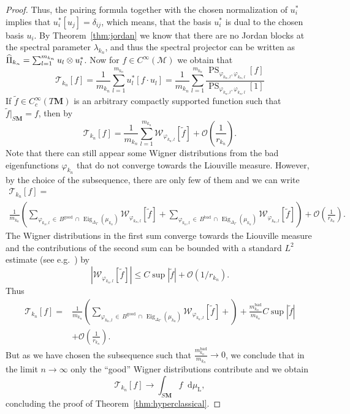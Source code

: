 \documentclass[AHL, Unicode, longabstracts, published]{cedram}
\DeclareMathOperator{\Eig}{Eig}
\DeclareMathOperator{\good}{good}
\DeclareMathOperator{\bad}{bad}
\newcommand{\rml}{\mathrm{L}}
\newcommand{\bfm}{\mathbf{M}}
\newcommand{\la}{\lambda}
\newcommand{\til}{\widetilde}
\newcommand{\intd}{\mathop{}\!\mathrm{d}}
\renewcommand*{\hat}[1]{\mathchoice{\widehat{#1}}{\widehat{#1}}{\oldhat{#1}}{\oldhat{#1}}}\let\oldexists\exists
\renewcommand*{\exists}{\mathrel{\oldexists}}
\begin{document}
\begin{proof}
Thus, the pairing formula together with the chosen normalization of $u_i^*$ implies that $u_i^*[u_j]=\delta_{ij}$, which means, that the basis $u_i^*$ is dual to the chosen basis $u_i$. By Theorem~\ref{thm:jordan} we know that there are no Jordan blocks at the spectral parameter $\la_{k_n}$, and thus the spectral projector can be written as $\hat \Pi_{k_n} = \sum_{l=1}^{m_{k_n}} u_l\otimes u_l^*$. Now for $f\in C^{\infty}(\mathcal M)$ we obtain that
\[
\mathcal T_{k_n}[f] = \frac{1}{m_{k_n}} \sum_{l=1}^{m_{k_n}} u_l^*[f\cdot u_l] = \frac{1}{m_{k_n}}\sum_{l=1}^{m_{k_n}} \frac{\operatorname{PS}_{\varphi_{k_n,l}, \varphi_{k_n,l}}[f]}{\operatorname{PS}_{\varphi_{k_n,l}, \varphi_{k_n,l}}[1]}
\]
If $\til f\in C_c^\infty(T\bfm)$ is an arbitrary compactly supported function such that $\til f|_{S{\bfm}}=f$, then by~\cite{HHS12}
\[
\mathcal T_{k_n}[f] =\frac{1}{m_{k_n}} \sum_{l=1}^{m_{k_n}} \mathcal W_{\varphi_{k_n,l}}[\til f] + \mathcal O\left(\frac{1}{r_{k_n}}\right).
\]
Note that there can still appear some Wigner distributions from the bad eigenfunctions $\varphi_{k_n}$ that do not converge towards the Liouville measure. However, by the choice of the subsequence, there are only few of them and we can write
\begin{multline*}
\mathcal T_{k_n}[f] =\\
\frac{1}{m_{k_n}}\left(\sum_{\varphi_{k_n, l}\,\in\, B^{\good}\,\cap\,\Eig_{\Delta_\Gamma}(\mu_{k_n})} \mathcal W_{\varphi_{k_n,l}}[\til f] +\!\! \sum_{\varphi_{k_n, l}\,\in\,B^{\bad}\,\cap\, \Eig_{\Delta_\Gamma}(\mu_{k_n})} \mathcal W_{\varphi_{k_n,l}}[\til f] \right) + \mathcal O\left(\frac{1}{r_{k_n}}\right).
\end{multline*}
The Wigner distributions in the first sum converge towards the Liouville measure and the contributions of the second sum can be bounded with a standard $L^2$ estimate (see e.g.~\cite[Theorem~5.1]{Zw12}) by
\[
|\mathcal W_{\varphi_{k_n,l}}[\til f]|\leq C\sup|\til f| + \mathcal O(1/r_{k_n}).
\]
Thus
\begin{align*}
\mathcal T_{k_n}[f] =&\frac{1}{m_{k_n}}\left(\sum_{\varphi_{k_n, l}\,\in\,B^{\good}\,\cap\, \Eig_{\Delta_\Gamma}(\mu_{k_n})} \mathcal W_{\varphi_{k_n,l}}[\til f] + \right) + \frac{m_{k_n}^{\bad}}{m_{k_n}}C\sup|\til f|\\
&+ \mathcal O\left(\frac{1}{r_{k_n}}\right).
\end{align*}
But as we have chosen the subsequence such that $\frac{m_{k_n}^{\bad}}{m_{k_n}} \to 0$, we conclude that in the limit $n\to\infty$ only the ``good'' Wigner distributions contribute and we obtain
\[
\mathcal T_{k_n}[f] \to \int_{S\mathbf M} f \intd \mu_{\rml},
\]
concluding the proof of Theorem~\ref{thm:hyperclassical}.
\end{proof}
\end{document}
